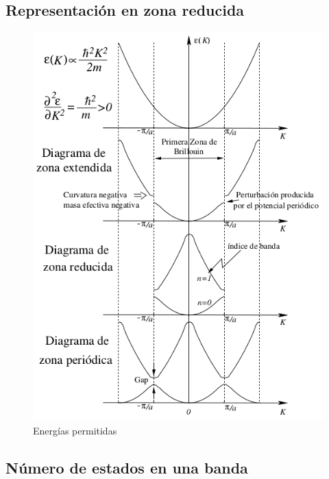 \documentclass[oneside]{book}
\numberwithin{equation}{section}
\numberwithin{figure}{section}
\numberwithin{table}{section}
\begin{document}
			\begin{center}
			\end{center}
		
			\subsection{Representación en zona reducida}
			
				\begin{figure}[H]
					\begin{center}
						\includegraphics[scale=0.7]{Bloch.png}
						 \caption{Energías permitidas}
					\end{center}					
				\end{figure}							
			
			\subsection{Número de estados en una banda}
			
\end{document}
